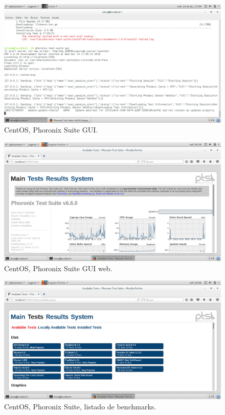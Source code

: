 \begin{figure}[H] 
	\centering
	\includegraphics[width=14.7cm]{./img/ejercicio1_4.png} 	
	\caption{CentOS, Phoronix Suite GUI.} \label{fig:ejercicio1_4}
\end{figure}

\begin{figure}[H] 
	\centering
	\includegraphics[width=14.7cm]{./img/ejercicio1_5.png} 	
	\caption{CentOS, Phoronix Suite GUI web.} \label{fig:ejercicio1_5}
\end{figure}

\begin{figure}[H] 
	\centering
	\includegraphics[width=14.7cm]{./img/ejercicio1_6.png} 	
	\caption{CentOS, Phoronix Suite, listado de benchmarks.} \label{fig:ejercicio1_6}
\end{figure}

